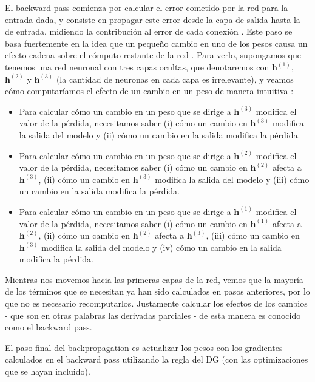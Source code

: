 \documentclass[../../main.tex]{subfiles}
\begin{document}
El backward pass comienza por calcular el error cometido por la red para la entrada dada,
y consiste en propagar este error desde la capa de salida hasta la de entrada, midiendo la
contribución al error de cada conexión \cite{hands-on-ML-sklearn-tf}. Este paso se basa
fuertemente en la idea que un pequeño cambio en uno de los pesos causa un efecto cadena
sobre el cómputo restante de la red \cite{prince2024understanding}. Para verlo, supongamos
que tenemos una red neuronal con tres capas ocultas, que denotaremos con \(\bm{h}^{(1)}\),
\(\bm{h}^{(2)}\) y \(\bm{h}^{(3)}\) (la cantidad de neuronas en cada capa es irrelevante),
y veamos cómo computaríamos el efecto de un cambio en un peso de manera intuitiva
\cite{prince2024understanding}:
\begin{itemize}
    \item Para calcular cómo un cambio en un peso que se dirige a \(\bm{h}^{(3)}\)
    modifica el valor de la pérdida, necesitamos saber (i) cómo un cambio en
    \(\bm{h}^{(3)}\) modifica la salida del modelo y (ii) cómo un cambio en la salida
    modifica la pérdida.
    \item Para calcular cómo un cambio en un peso que se dirige a \(\bm{h}^{(2)}\)
    modifica el valor de la pérdida, necesitamos saber (i) cómo un cambio en
    \(\bm{h}^{(2)}\) afecta a \(\bm{h}^{(3)}\), (ii) cómo un cambio en \(\bm{h}^{(3)}\)
    modifica la salida del modelo y (iii) cómo un cambio en la salida modifica la pérdida.
    \item Para calcular cómo un cambio en un peso que se dirige a \(\bm{h}^{(1)}\)
    modifica el valor de la pérdida, necesitamos saber (i) cómo un cambio en
    \(\bm{h}^{(1)}\) afecta a \(\bm{h}^{(2)}\), (ii) cómo un cambio en \(\bm{h}^{(2)}\)
    afecta a \(\bm{h}^{(3)}\), (iii) cómo un cambio en \(\bm{h}^{(3)}\) modifica la salida
    del modelo y (iv) cómo un cambio en la salida modifica la pérdida.
\end{itemize}
Mientras nos movemos hacia las primeras capas de la red, vemos que la mayoría de los
términos que se necesitan ya han sido calculados en pasos anteriores, por lo que no es
necesario recomputarlos. Justamente calcular los efectos de los cambios - que son en otras
palabras las derivadas parciales - de esta manera es conocido como el backward pass.

El paso final del backpropagation es actualizar los pesos con los gradientes calculados
en el backward pass utilizando la regla del DG (con las optimizaciones que se hayan
incluido).
\end{document}
